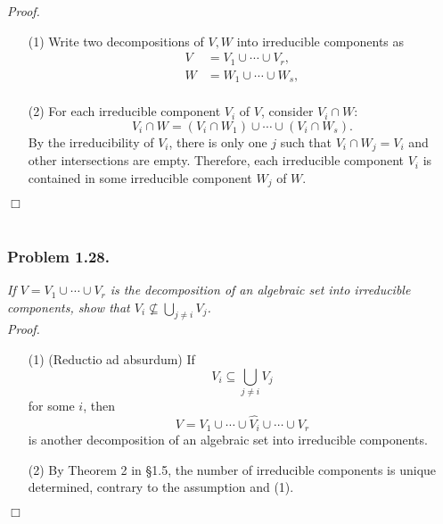 \documentclass{article}
\begin{document}
\emph{Proof.}
\begin{enumerate}
\item[(1)]
  Write two decompositions of $V, W$ into irreducible components as
  \begin{align*}
    V &= V_1 \cup \cdots \cup V_r, \\
    W &= W_1 \cup \cdots \cup W_s, \\
  \end{align*}

\item[(2)]
  For each irreducible component $V_i$ of $V$,
  consider $V_i \cap W$:
  \[
    V_i \cap W = (V_i \cap W_1) \cup \cdots \cup (V_i \cap W_s).
  \]
  By the irreducibility of $V_i$,
  there is only one $j$ such that $V_i \cap W_j = V_i$
  and other intersections are empty.
  Therefore, each irreducible component $V_i$ is contained in
  some irreducible component $W_j$ of $W$.
\end{enumerate}
$\Box$ \\\\






\subsubsection*{Problem 1.28.}
\emph{If $V = V_1 \cup \cdots \cup V_r$ is the decomposition
of an algebraic set into irreducible components,
show that $V_i \not\subseteq \bigcup_{j \neq i} V_j$.} \\

\emph{Proof.}
\begin{enumerate}
\item[(1)]
  (Reductio ad absurdum)
  If
  \[
    V_i \subseteq \bigcup_{j \neq i} V_j
  \]
  for some $i$, then
  \[
    V = V_1 \cup \cdots \cup \widehat{V_i} \cup \cdots \cup V_r
  \]
  is another decomposition of an algebraic set into irreducible components.

\item[(2)]
  By Theorem 2 in \S 1.5, the number of irreducible components is unique determined,
  contrary to the assumption and (1).
\end{enumerate}
$\Box$ \\\\
\end{document}
